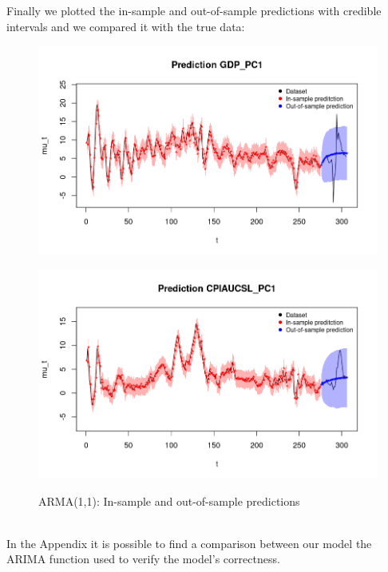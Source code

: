 Finally we plotted the in-sample and out-of-sample predictions with credible intervals and we compared it with the true data: \\    
\begin{figure}[h]
    \centering
    \begin{minipage}[t]{0.7\textwidth}
        \centering
        \includegraphics[width=\textwidth]{../Images/4-ARMA/gdp_prediction.png}
        \label{fig:ARMA_first}
    \end{minipage}
    \begin{minipage}[t]{0.7\textwidth}
        \centering
        \includegraphics[width=\textwidth]{../Images/4-ARMA/infl_prediction.png}
        \label{fig:ARMA_second}
    \end{minipage}
    \caption{ARMA(1,1): In-sample and out-of-sample predictions}
    \label{fig:ARMA_combined}
\end{figure} \\
In the Appendix it is possible to find a comparison between our model the ARIMA function used to verify the model's correctness.